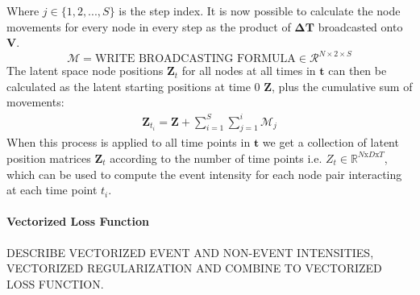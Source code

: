 Where $j \in \{1,2,...,S\}$ is the step index.
It is now possible to calculate the node movements for every node in every step as the product of $\boldsymbol{\Delta}\textbf{T}$ broadcasted\cite{BroadcastingDocumentation} onto $\textbf{V}$. 
\begin{equation}
    \boldsymbol{\mathcal{M}} = \text{WRITE BROADCASTING FORMULA} \in \mathcal{R}^{N \times 2 \times S}
\end{equation}
The latent space node positions $\textbf{Z}_{t}$ for all nodes at all times in $\textbf{t}$ can then be calculated as the latent starting positions at time 0 $\textbf{Z}$, plus the cumulative sum of movements:
\begin{align}
    \textbf{Z}_{t_i} = \textbf{Z} + \sum_{i=1}^{S}\sum_{j=1}^{i}\boldsymbol{\mathcal{M}}_j
\end{align}
When this process is applied to all time points in $\textbf{t}$ we get a collection of latent position matrices $\textbf{Z}_t$ according to the number of time points i.e. $Z_t \in \mathbb{R}^{N\text{x}D\text{x}T}$, which can be used to compute the event intensity for each node pair interacting at each time point $t_i$.

\paragraph{Vectorized Loss Function}
DESCRIBE VECTORIZED EVENT AND NON-EVENT INTENSITIES, VECTORIZED REGULARIZATION AND COMBINE TO VECTORIZED LOSS FUNCTION.

